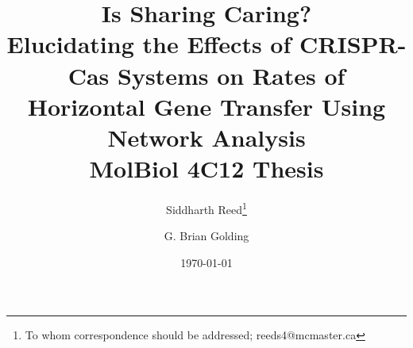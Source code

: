 \documentclass[12pt,letter]{article}
\begin{document}
\title{{\fontsize{30}{50}\selectfont Is Sharing Caring?}\\\vspace{0.4cm}
    Elucidating the Effects of CRISPR-Cas Systems on Rates of Horizontal Gene Transfer Using Network Analysis\\
       \Large MolBiol 4C12 Thesis}
\author[1]{Siddharth Reed\thanks{To whom correspondence should be addressed; reeds4@mcmaster.ca}}
\author[1]{G. Brian Golding\vspace{-0.45cm}}
\date{\today}
\maketitle

\newpage
\linespread{1.25}%












\printbibliography
\end{document}
